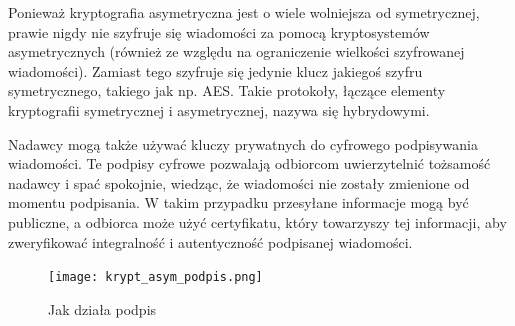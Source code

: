 \documentclass[a4paper,12pt,oneside]{book}
\begin{document}
				Ponieważ kryptografia asymetryczna jest o wiele wolniejsza od symetrycznej, prawie nigdy nie szyfruje się wiadomości za pomocą kryptosystemów asymetrycznych (również ze względu na ograniczenie wielkości szyfrowanej wiadomości). Zamiast tego szyfruje się jedynie klucz jakiegoś szyfru symetrycznego, takiego jak np. AES. Takie protokoły, łączące elementy kryptografii symetrycznej i asymetrycznej, nazywa się hybrydowymi.
				
				Nadawcy mogą także używać kluczy prywatnych do cyfrowego podpisywania wiadomości. Te podpisy cyfrowe pozwalają odbiorcom uwierzytelnić tożsamość nadawcy i spać spokojnie, wiedząc, że wiadomości nie zostały zmienione od momentu podpisania. W takim przypadku przesyłane informacje mogą być publiczne, a odbiorca może użyć certyfikatu, który towarzyszy tej informacji, aby zweryfikować integralność i autentyczność podpisanej wiadomości.
				
				\begin{figure}[h]
					\centering\texttt{[image: krypt\_asym\_podpis.png]}
					\caption{Jak działa podpis}
				\end{figure}
				
\end{document}
